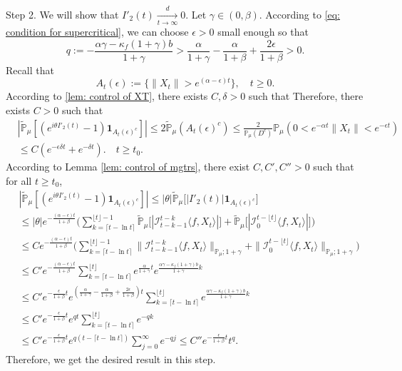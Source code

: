 \documentclass[12pt,a4paper]{amsart}
\theoremstyle{plain}
\theoremstyle{definition}
\numberwithin{equation}{section}
\begin{document}
	Step 2.
	We will show that $I'_2(t)\xrightarrow[t\to \infty]{d} 0$.
	Let $\gamma \in (0,\beta)$.
	According to \eqref{eq: condition for supercritical}, we can choose $\epsilon > 0$ small enough so that
\[
	q:= - \frac{\alpha \gamma-\kappa_f(1+\gamma)b}{1+\gamma}
	> \frac{\alpha}{1+\gamma}-\frac{\alpha}{1+\beta} + \frac{2\epsilon}{1+\beta} > 0.
\]
	Recall that
\[
	 A_t(\epsilon)
	:=\{\|X_t\|>e^{(\alpha-\epsilon )t}\},
	\quad t\geq 0.
\]
	According to \eqref{lem: control of XT}, there exists
	$C,\delta>0$ such that
	Therefore, there exists $C>0$ such that
\begin{equation}\begin{split}
    &|\mathbb{\tilde{P}}_{\mu}[(e^{i\theta I'_2(t)}-1)\mathbf{1}_{A_t(\epsilon)^c}]|
    \leq 2\mathbb{\tilde{P}}_{\mu}(A_t(\epsilon)^c)\leq \frac{2}{\mathbb{P}_{\mu}(D^c)}\mathbb{P}_{\mu}(0<e^{-\alpha t}\|X_t\|<e^{-\epsilon t})
    \\&\leq C(e^{-\epsilon\delta t}+e^{-\delta t}).
    \quad t\geq t_0.
\end{split}\end{equation}
	According to Lemma \ref{lem: control of mgtrs}, there exist $C,C',C''>0$ such that for all
	$t\ge t_0$,
\begin{align*}
    &|\mathbb{\tilde{P}}_{\mu} [ (e^{i\theta I'_2(t)}-1)\mathbf{1}_{A_t(\epsilon)^c}]|
    \leq |\theta| \mathbb{\tilde{P}}_{\mu} \big[ |I'_2(t)|\mathbf{1}_{A_t(\epsilon)^c}\big]
    \\&\leq|\theta| e^{-\frac{(\alpha - \epsilon )t}{1+\beta}} \Big(\sum_{k=\lceil t-\ln t \rceil}^{\lfloor t \rfloor - 1}\mathbb{\tilde{P}}_{\mu}\big[| \mathcal{I}_{t-k-1}^{t-k}\langle f,X_t\rangle|\big] + \mathbb{\tilde{P}}_{\mu}\big[| \mathcal{I}_{0}^{t-\lfloor t\rfloor}\langle f,X_t\rangle|\big]\Big)
    \\& \leq C  e^{-\frac{(\alpha - \epsilon )t}{1+\beta}} \Big(\sum_{k=\lceil t-\ln t \rceil}^{\lfloor t \rfloor - 1}\|\mathcal{I}_{t-k-1}^{t-k}\langle f,X_t\rangle\|_{\mathbb P_\mu; 1+\gamma} + \|\mathcal I_0^{t-\lfloor t \rfloor} \langle f, X_t\rangle\|_{\mathbb P_\mu;1+\gamma}\Big)
    \\ &\leq C'  e^{-\frac{(\alpha - \epsilon )t}{1+\beta}} \sum_{k=\lceil t-\ln t \rceil}^{\lfloor t \rfloor}e^{\frac{\alpha}{1+\gamma}t}e^{\frac{\alpha\gamma-\kappa_f(1+\gamma)b}{1+\gamma}k}\\
    &\leq C'  e^{-\frac{\epsilon}{1+\beta} t}e^{(\frac{\alpha }{1+\gamma}-\frac{\alpha }{1+\beta} + \frac{2\epsilon}{1+\beta})t} \sum_{k=\lceil t-\ln t \rceil}^{\lfloor t \rfloor}e^{\frac{\alpha\gamma-\kappa_f(1+\gamma)b}{1+\gamma}k}\\
    &\leq C'  e^{-\frac{\epsilon}{1+\beta} t} e^{qt} \sum_{k=\lceil t-\ln t \rceil}^{\lfloor t \rfloor}e^{-qk}\\
    &\leq C'  e^{-\frac{\epsilon}{1+\beta} t} e^{q(t - \lceil t - \ln t\rceil)} \sum_{j=0}^{\infty}e^{-qj}\leq C'' e^{-\frac{\epsilon}{1+\beta} t} t^q.
\end{align*}
	Therefore, we get the desired result in this step.
\end{document}
